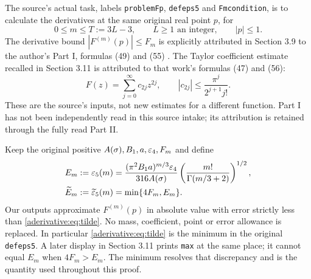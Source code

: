\documentclass[11pt]{article}
\begin{document}
The source's actual task, labels \texttt{problemFp},
\texttt{defeps5} and \texttt{Fmcondition}, is to calculate the
derivatives at the same original real point $p$, for
\begin{equation}\label{aderivative:eq:indices}
0\le m\le T:=3L-3,\qquad L\ge1\text{ an integer},\qquad |p|\le1.
\end{equation}
The derivative bound $|F^{(m)}(p)|\le F_m$ is explicitly attributed
in Section 3.9 to the author's Part I, formulas (49) and (55)
\cite{aderivative:AriasI}. The Taylor coefficient estimate recalled in Section
3.11 is attributed to that work's formulas (47) and (56):
\begin{equation}\label{aderivative:eq:Fclass}
F(z)=\sum_{j=0}^{\infty}c_{2j}z^{2j},\qquad
|c_{2j}|\le\frac{\pi^j}{2^{j+1}j!}.
\end{equation}
These are the source's inputs, not new estimates for a different
function. Part I has not been independently read in this source
intake; its attribution is retained through the fully read Part II.

Keep the original positive $A(\sigma),B_1,a,\varepsilon_4,F_m$ and define
\begin{align}
E_m:=\varepsilon_5(m)
&=\frac{(\pi^2B_1a)^{m/3}\varepsilon_4}{316A(\sigma)}
\left(\frac{m!}{\Gamma(m/3+2)}\right)^{1/2},\label{aderivative:eq:eps5}\\
\widetilde E_m:=\widetilde{\varepsilon}_5(m)
&=\min\{4F_m,E_m\}.\label{aderivative:eq:tilde}
\end{align}
Our outputs approximate $F^{(m)}(p)$ in absolute value with error
strictly less than \eqref{aderivative:eq:tilde}. No mass, coefficient, point
or error allowance is replaced. In particular \eqref{aderivative:eq:tilde}
is the minimum in the original \texttt{defeps5}. A later display
in Section 3.11 prints \texttt{max} at the same place; it cannot
equal $E_m$ when $4F_m>E_m$. The minimum resolves that discrepancy
and is the quantity used throughout this proof.
\end{document}
